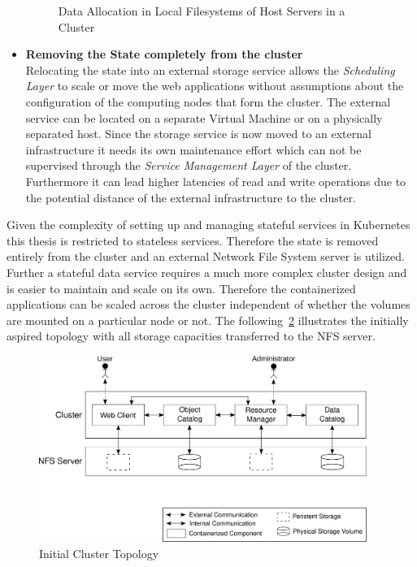 \begin{itemize}
{\begin{figure}[h]
    \caption{Data Allocation in Local Filesystems of Host Servers in a Cluster}
    \label{fig:node_storage}
\end{figure}
    }
    \item[]{\textbf{Removing the State completely from the cluster}\\
    Relocating the state into an external storage service allows the \textit{Scheduling Layer} to scale or move the web applications without assumptions about the configuration of the computing nodes that form the cluster.
    The external service can be located on a separate Virtual Machine or on a physically separated host.
    Since the storage service is now moved to an external infrastructure it needs its own maintenance effort which can not be supervised through the \textit{Service Management Layer} of the cluster.
    Furthermore it can lead higher latencies of read and write operations due to the potential distance of the external infrastructure to the cluster.
    }
\end{itemize}
Given the complexity of setting up and managing stateful services in Kubernetes this thesis is restricted to stateless services.
Therefore the state is removed entirely from the cluster and an external Network File System server is utilized.
Further a stateful data service requires a much more complex cluster design and is easier to maintain and scale on its own.
Therefore the containerized applications can be scaled across the cluster independent of whether the volumes are mounted on a particular node or not.
The following~\cref{fig:high_level_topology} illustrates the initially aspired topology with all storage capacities transferred to the NFS server.
\begin{figure}[h]
    \centering
    \includegraphics[width=0.95\textwidth]{graphics/high_level_topology.svg}
    \caption{Initial Cluster Topology}
    \label{fig:high_level_topology}
\end{figure}
